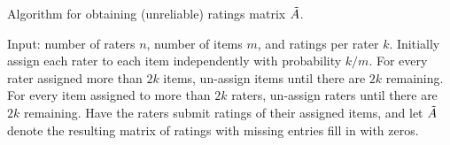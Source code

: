 \begin{algorithm}[b!]
\caption{Algorithm for obtaining (unreliable) ratings matrix $\tilde{A}$.}
\label{alg:create-A}
\begin{algorithmic}[1]
\State Input: number of raters $n$,  number of items $m$, and ratings per rater $k$.
\State Initially assign each rater to each item independently with probability $k/m$.  
\State For every rater assigned more than $2k$ items, un-assign items until 
       there are $2k$ remaining.
\State For every item assigned to more than $2k$
       raters, un-assign raters until there are $2k$ remaining.
\State Have the raters submit ratings of their assigned items, and let $\tilde{A}$ 
       denote the resulting matrix of ratings with missing entries fill in with 
       zeros.
\end{algorithmic}
\end{algorithm}



